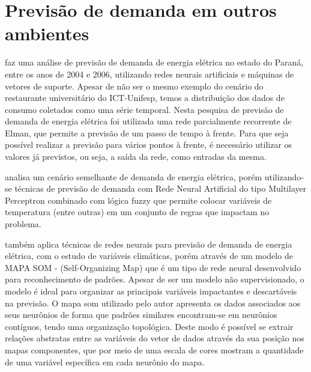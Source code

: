     \section{Previsão de demanda em outros ambientes}
         faz uma análise de previsão de demanda de energia elétrica no estado do Paraná, entre os anos de 2004 e 2006, utilizando redes neurais artificiais e máquinas de vetores de suporte. Apesar de não ser o mesmo exemplo do cenário do restaurante universitário do ICT-Unifesp, temos a distribuição dos dados de consumo coletados como uma série temporal. Nesta pesquisa de previsão de demanda de energia elétrica foi utilizada uma rede parcialmente recorrente de Elman, que permite a previsão de um passo de tempo à frente. Para que seja possível realizar a previsão para vários pontos à frente, é necessário utilizar os valores já previstos, ou seja, a saída da rede, como entradas da mesma.
        
         analisa um cenário semelhante de demanda de energia elétrica, porém utilizando-se técnicas de previsão de demanda com Rede Neural Artificial do tipo Multilayer Perceptron combinado com lógica fuzzy que permite colocar variáveis de temperatura (entre outras) em um conjunto de regras que impactam no problema.
        
         também aplica técnicas de redes neurais para previsão de demanda de energia elétrica, com o estudo de variáveis climáticas, porém através de um modelo de MAPA SOM - (Self-Organizing Map) que é um tipo de rede neural desenvolvido para reconhecimento de padrões. Apesar de ser um modelo não supervisionado, o modelo é ideal para organizar as principais variáveis impactantes e descartáveis na previsão. O mapa som utilizado pelo autor apresenta os dados associados aos seus neurônios de forma que padrões similares encontram-se em neurônios contíguos, tendo uma organização topológica. Deste modo é possível se extrair relações abstratas entre as variáveis do vetor de dados através da sua posição nos mapas componentes, que por meio de uma escala de cores mostram a quantidade de uma variável específica em cada neurônio do mapa.